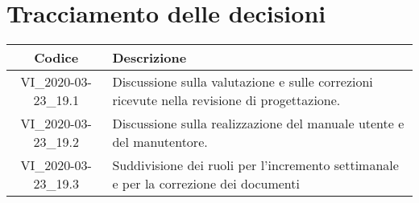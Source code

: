 \section*{Tracciamento delle decisioni}

\begin{center}
	\begin{longtable}{|c|p{12.25cm}|}
		\hline
		\rowcolor{lighter-grayer}
		\textbf{Codice} & \textbf{Descrizione} \\
		\hline
		\endfirsthead
		
		\hline
		VI\_2020-03-23\_19.1 & Discussione sulla valutazione e sulle correzioni ricevute nella revisione di progettazione. \\
		\hline
		VI\_2020-03-23\_19.2 & Discussione sulla realizzazione del manuale utente e del manutentore. \\
		\hline
		VI\_2020-03-23\_19.3 & Suddivisione dei ruoli per l'incremento settimanale e per la correzione dei documenti \\
		\hline
		
	\end{longtable}
\end{center}
